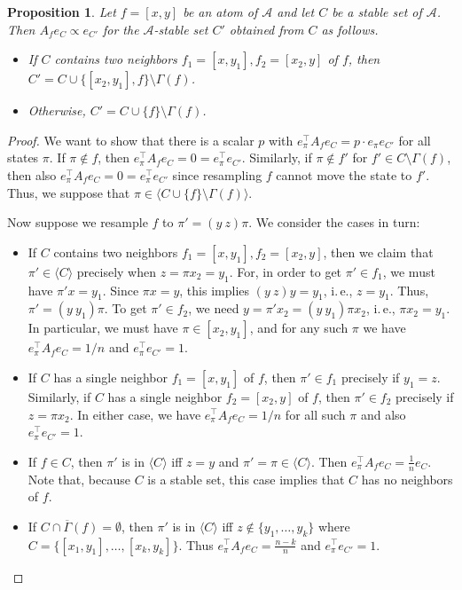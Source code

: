 \documentclass[11pt]{article}
\newtheorem{proposition}[theorem]{Proposition}
\newcommand{\ie}{i.\,e.}
\begin{document}
\begin{proposition}
\label{add-1-prop}
Let $f = [x,y]$ be an atom of $\mathcal A$ and let $C$ be a stable set of $\mathcal A$. Then $A_f e_C \propto e_{C'}$ for the $\mathcal A$-stable set $C'$ obtained from $C$ as follows. %
\begin{itemize}
\item If $C$ contains two neighbors $f_1 = [x,y_1], f_2 = [x_2,y]$ of $f$, then $C' = C \cup \{ [x_2, y_1], f \} \setminus \Gamma(f)$.
\item Otherwise,  $C' = C \cup \{ f \} \setminus \Gamma(f)$.
\end{itemize}
\end{proposition}
\begin{proof}
We want to show that there is a scalar $p$ with $e_{\pi}^{\top} A_f e_C = p \cdot e_{\pi} e_{C'}$ for all states $\pi$.  If $\pi \notin f$, then $e_{\pi}^{\top} A_f e_C = 0 = e_{\pi}^{\top} e_{C'}$. Similarly, if $\pi \notin f'$ for $f' \in C \setminus \Gamma(f)$, then also $e_{\pi}^{\top} A_f e_C = 0 = e_{\pi}^{\top} e_{C'}$ since resampling $f$ cannot move the state to $f'$.  Thus, we suppose that $\pi \in \langle C \cup \{f \} \setminus \Gamma(f) \rangle$. 

Now suppose we resample $f$ to $\pi' = (y \ z) \pi$. We consider the cases in turn:
\begin{itemize}
\item If $C$ contains two neighbors $f_1 = [x,y_1], f_2 = [x_2,y]$, then we claim that $\pi' \in \langle C \rangle$ precisely when $z = \pi x_2 = y_1$. For, in order to get $\pi' \in f_1$,  we must have $\pi' x = y_1$. Since $\pi x = y$, this implies $(y \ z) y = y_1$, \ie, $z = y_1$. Thus, $\pi' = (y \ y_1) \pi$. To get $\pi' \in f_2$, we need $y = \pi' x_2 = (y \ y_1) \pi x_2$, \ie, $\pi x_2 = y_1$.   In particular, we must have $\pi \in [x_2, y_1]$, and for any such $\pi$ we have $e_{\pi}^{\top} A_f e_C = 1/n$ and $e_{\pi}^{\top} e_{C'} = 1$.

\item If  $C$ has a single neighbor $f_1 = [x, y_1]$ of $f$, then $\pi' \in f_1$ precisely if $y_1 = z$. Similarly, if $C$ has a single neighbor $f_2 = [x_2, y]$ of $f$, then $\pi' \in f_2$ precisely if $z = \pi x_2$.  In either case, we have $e_{\pi}^{\top} A_f e_C = 1/n$ for all such $\pi$ and also $e_{\pi}^{\top} e_{C'} = 1$.

\item If $f \in C$, then $\pi'$ is in $\langle C \rangle$ iff $z =  y$ and $\pi' = \pi \in \langle C \rangle$. Then $e_{\pi}^{\top} A_f e_C = \frac{1}{n} e_C$. Note that, because $C$ is a stable set, this case implies that $C$ has no neighbors of $f$.

 \item If $C \cap \overline \Gamma(f) = \emptyset$, then $\pi'$ is in $\langle C \rangle$ iff $z \notin \{ y_1, \dots, y_k \}$ where $C = \{ [x_1, y_1], \dots, [x_k, y_k] \}$. Thus $e_{\pi}^{\top} A_f e_C = \frac{n - k}{n}$ and $e_{\pi}^{\top} e_{C'} = 1$. \qedhere
 \end{itemize}
\end{proof}
\end{document}
